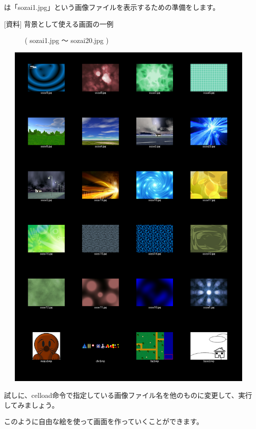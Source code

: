 \documentclass[a4paper,12pt]{jarticle}
\begin{document}
は「sozai1.jpg」という画像ファイルを表示するための準備をします。

\bigskip

[資料] 背景として使える画面の一例

　　　( sozai1.jpg 〜 sozai20.jpg )

\bigskip
\bigskip

\begin{minipage}{9.781cm}
\centering
{\upshape
\includegraphics[keepaspectratio,width=14.843cm,height=17.609cm]{text04-img/text04-img014.png}}
\end{minipage}

\bigskip
\bigskip
\bigskip


試しに、celload命令で指定している画像ファイル名を他のものに変更して、実行してみましょう。

このように自由な絵を使って画面を作っていくことができます。

\bigskip

\bigskip
\end{document}
